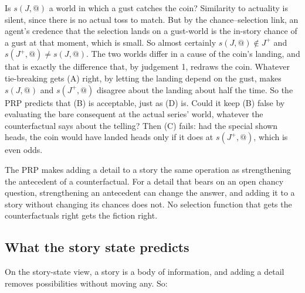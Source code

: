 \documentclass[
  11pt,
  letterpaper,
  DIV=11,
  numbers=noendperiod,
  twoside]{scrartcl}
\begin{document}
Is \(s(J, @)\) a world in which a gust catches the coin? Similarity to
actuality is silent, since there is no actual toss to match. But by the
chance--selection link, an agent's credence that the selection lands on
a gust-world is the in-story chance of a gust at that moment, which is
small. So almost certainly \(s(J, @) \notin J^{+}\) and
\(s(J^{+}, @) \neq s(J, @)\). The two worlds differ in a cause of the
coin's landing, and that is exactly the difference that, by judgement 1,
redraws the coin. Whatever tie-breaking gets (A) right, by letting the
landing depend on the gust, makes \(s(J, @)\) and \(s(J^{+}, @)\)
disagree about the landing about half the time. So the PRP predicts that
(B) is acceptable, just as (D) is. Could it keep (B) false by evaluating
the bare consequent at the actual series' world, whatever the
counterfactual says about the telling? Then (C) fails: had the special
shown heads, the coin would have landed heads only if it does at
\(s(J^{+}, @)\), which is even odds.

The PRP makes adding a detail to a story the same operation as
strengthening the antecedent of a counterfactual. For a detail that
bears on an open chancy question, strengthening an antecedent can change
the answer, and adding it to a story without changing its chances does
not. No selection function that gets the counterfactuals right gets the
fiction right.

\subsection{What the story state
predicts}\label{what-the-story-state-predicts}

On the story-state view, a story is a body of information, and adding a
detail removes possibilities without moving any. So:
\end{document}
